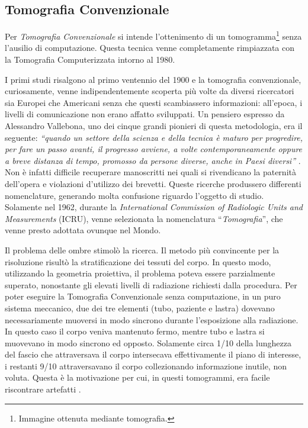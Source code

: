 \documentclass[a4paper,12pt, doubleside]{report}
\begin{document}
            \subsection{Tomografia Convenzionale}
            \label{sub:TomografiaConvenzionale}
                \par
                    Per \textit{Tomografia Convenzionale} si intende l'ottenimento di un tomogramma\footnote{Immagine ottenuta mediante tomografia.} senza l'ausilio di computazione. Questa tecnica venne completamente rimpiazzata con la Tomografia Computerizzata intorno al 1980.
                
                \bigskip            
                \par
                    I primi studi risalgono al primo ventennio del 1900 e la tomografia convenzionale, curiosamente, venne indipendentemente scoperta più volte da diversi ricercatori sia Europei che Americani senza che questi scambiassero informazioni: all'epoca, i livelli di comunicazione non erano affatto sviluppati. Un pensiero espresso da Alessandro Vallebona, uno dei cinque grandi pionieri di questa metodologia, era il seguente: \textit{“quando un settore della scienza e della tecnica è maturo per progredire, per fare un passo avanti, il progresso avviene, a volte contemporaneamente oppure a breve distanza di tempo, promosso da persone diverse, anche in Paesi diversi”} \cite{vallebona-pensiero}.
                    Non è infatti difficile recuperare manoscritti nei quali si rivendicano la paternità dell'opera e violazioni d'utilizzo dei brevetti\cite{vallebona-difesa}. Queste ricerche produssero differenti nomenclature, generando molta confusione riguardo l'oggetto di studio. Solamente nel 1962, durante la \textit{International Commission of Radiologic Units and Measurements} (ICRU), venne selezionata la nomenclatura “\textit{Tomografia}”, che venne presto adottata ovunque nel Mondo.
                            
                \bigskip
                \par
                    Il problema delle ombre stimolò la ricerca. Il metodo più convincente per la risoluzione risultò la stratificazione dei tessuti del corpo. In questo modo, utilizzando la geometria proiettiva, il problema poteva essere parzialmente superato, nonostante gli elevati livelli di radiazione richiesti dalla procedura. Per poter eseguire la Tomografia Convenzionale senza computazione, in un puro sistema meccanico, due dei tre elementi (tubo, paziente e lastra) dovevano necessariamente muoversi in modo sincrono durante l’esposizione alla radiazione.  In questo caso il corpo veniva mantenuto fermo, mentre tubo e lastra si muovevano in modo sincrono ed opposto. Solamente circa 1/10 della lunghezza del fascio che attraversava il corpo intersecava effettivamente il piano di interesse, i restanti 9/10 attraversavano il corpo collezionando informazione inutile, non voluta. Questa è la motivazione per cui, in questi tomogrammi, era facile riscontrare artefatti \cite{hounsfield-nobel-lecture}.
                
\end{document}
